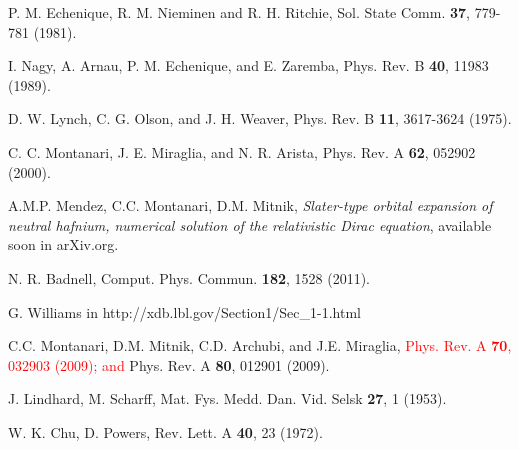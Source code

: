 \documentclass[aps,pra,reprint,superscriptaddress]{revtex4-1}
\def\clau#1{\textcolor{red}{#1}}
\begin{document}
\begin{thebibliography}{00}
P. M. Echenique, R. M. Nieminen and R. H. Ritchie, 
Sol. State Comm. \textbf{37}, 779-781 (1981).

I. Nagy, A. Arnau, P. M. Echenique, and E. Zaremba, 
Phys. Rev. B \textbf{40}, 11983 (1989).

D. W. Lynch, C. G. Olson, and J. H. Weaver, 
Phys. Rev. B \textbf{11}, 3617-3624 (1975).

C. C. Montanari, J. E. Miraglia, and N. R. Arista, 
Phys. Rev. A \textbf{62}, 052902 (2000).

A.M.P. Mendez, C.C. Montanari, D.M. Mitnik, 
\textit{Slater-type orbital expansion of neutral hafnium, numerical 
solution of the relativistic Dirac equation}, 
available soon in arXiv.org. 

N. R. Badnell, Comput. Phys. Commun. \textbf{182}, 1528 (2011).

G. Williams in http://xdb.lbl.gov/Section1/Sec\_1-1.html


C.C. Montanari, D.M. Mitnik, C.D. Archubi, and J.E. Miraglia, 
\clau{Phys. Rev. A \textbf{70}, 032903 (2009); and} Phys. Rev. A \textbf{80}, 012901 (2009).

J. Lindhard, M. Scharff,  
Mat. Fys. Medd. Dan. Vid. Selsk  \textbf{27}, 1 (1953).

W. K. Chu, D. Powers, 
Rev. Lett. A \textbf{40}, 23 (1972).




\end{thebibliography}
\end{document}
